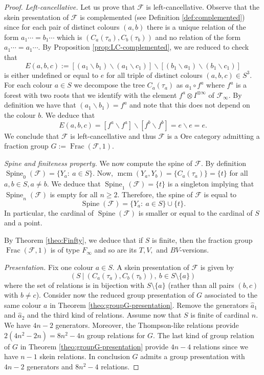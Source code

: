 \documentclass[a4paper, 12pt]{amsart}
\numberwithin{equation}{section}
\theoremstyle{definition}
\newcommand{\bs}{\backslash}
\newcommand{\cF}{\mathcal F}
\DeclareMathOperator{\Frac}{Frac}
\DeclareMathOperator{\mcm}{mcm}
\newcommand{\ot}{\otimes}
\DeclareMathOperator{\Sp}{Spine}
\newcommand{\wh}{\widehat}
\begin{document}
\begin{proof}
{\it Left-cancellative.}
Let us prove that $\cF$ is left-cancellative.
Observe that the skein presentation of $\cF$ is complemented (see Definition \ref{def:complemented}) since for each pair of distinct colours $(a,b)$ there is a unique relation of the form $a_1\cdots=b_1\cdots$ which is $(C_a(\tau_a),C_b(\tau_b))$ and no relation of the form $a_1\cdots=a_1\cdots.$
By Proposition \ref{prop:LC-complemented}, we are reduced to check that 
\begin{equation*}E(a,b,c):=[(a_1\bs b_1)\bs (a_1\bs c_1)]\bs [(b_1\bs a_1)\bs (b_1\bs c_1)]\end{equation*}
is either undefined or equal to $e$ for all triple of distinct colours $(a,b,c)\in S^3.$
For each colour $a\in S$ we decompose the tree $C_a(\tau_a)$ as $a_1\circ f^a$ where $f^a$ is a forest with two roots that we identify with the element $f^a\ot I^{\ot \infty}$ of $\cF_\infty.$
By definition we have that $(a_1\bs b_1) = f^a$ and note that this does not depend on the colour $b$.
We deduce that 
$$E(a,b,c)=[f^a\bs f^a]\bs [f^b \bs f^b] = e\bs e =e.$$
We conclude that $\cF$ is left-cancellative and thus $\cF$ is a Ore category admitting a fraction group $G:=\Frac(\cF,1).$

{\it Spine and finiteness property.}
We now compute the spine of $\cF$.
By definition $\Sp_0(\cF)=\{Y_a:\ a\in S\}.$
Now, $\mcm(Y_a,Y_b)=\{C_a(\tau_a)\} = \{ t\}$ for all $a,b\in S, a\neq b.$
We deduce that $\Sp_1(\cF)=\{t\}$ is a singleton implying that $\Sp_n(\cF)$ is empty for all $n\geq 2$. 
Therefore, the spine of $\cF$ is equal to $$\Sp(\cF)=\{Y_a:\ a\in S\}\cup \{t\}.$$ 
In particular, the cardinal of $\Sp(\cF)$ is smaller or equal to the cardinal of $S$ and a point.

By Theorem \ref{theo:Finfty}, we deduce that if $S$ is finite, then the fraction group $\Frac(\cF,1)$ is of type $F_\infty$ and so are its $T,V,$ and $BV$-versions.

{\it Presentation.}
Fix one colour $a\in S$.
A skein presentation of $\cF$ is given by 
$$(S \ | \ (C_a(\tau_a),C_b(\tau_b)),\ b\in S\setminus\{a\})$$
where the set of relations is in bijection with $S\setminus\{a\}$ (rather than all pairs $(b,c)$ with $b\neq c$).
Consider now the reduced group presentation of $G$ associated to the same colour $a$ in Theorem \ref{theo:groupG-presentation}.
Remove the generators $\wh a_1$ and $\wh a_2$ and the third kind of relations.
Assume now that $S$ is finite of cardinal $n.$
We have $4n-2$ generators.
Moreover, the Thompson-like relations provide $2(4n^2 - 2n)=8n^2 - 4n$ group relations for $G$.
The last kind of group relation of $G$ in Theorem \ref{theo:groupG-presentation} provide $4n-4$ relations since we have $n-1$ skein relations.
In conclusion $G$ admits a group presentation with $4n-2$ generators and $8n^2-4$ relations.
\end{proof}
\end{document}

